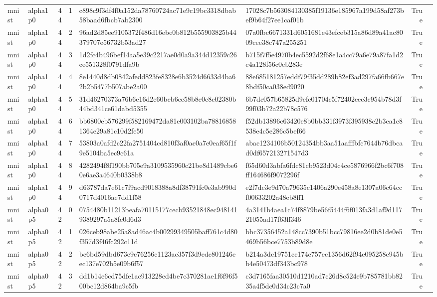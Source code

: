 \begin{tabular}{llrrllrl}
mnist & alpha1p0 & 44 & 1 & c898c9f3df4f0a152da78760724ac71e9c19bc3318dbab58baad6fbcb7ab2300 & 17028c7b563084130385f19136e185967a199d58af273bef9b64f27ee1caf01b & True &  \\
mnist & alpha1p0 & 44 & 2 & 96ad2d85ee9105372f486d16ebe0b812b555903825b44379707e56732b53ad27 & 07a0fbc6671331d6051681e43efceb315a86d89a41ac8009cee38c747a255251 & True &  \\
mnist & alpha1p0 & 44 & 3 & 1d2fc4b496bef14aa5e39c2217ae0d0a9a344d12359c26ce551328f0791dfa9b & b715f7f5e4970b4ec5592d2f68e1a4cc79a6e79a87fa1d2c4a128f56c0eb283e & True &  \\
mnist & alpha1p0 & 44 & 4 & 8e1440d8db0842afedd823fe8328e6b3524d6633d4ba62b2b5477b507abe2a00 & 88e685181257eddf79f35dd289b82ef3ad297fa66fb667e8bdf50ca038ed9020 & True &  \\
mnist & alpha1p0 & 44 & 5 & 31d46270373a76b6e16d2c60beb6ee58b8e0c8c02380b44bd341ce61dabd5355 & 6b7dc057b65825d9efc01704c5f72402eec3c954b78d3f99f03b72a22b78c576 & True &  \\
mnist & alpha1p0 & 44 & 6 & bb6800eb576299f582169472da81e003102ba788168581364e29a81c10d2fe50 & f52db13896c63420e8b0bb331f3973f395938c2b3ea1e8538e4c5e286c5bef66 & True &  \\
mnist & alpha1p0 & 44 & 7 & 53803a0afd2c22fa2751404cd810f3af0ac0a7e0eaf65f1f9e5104ba5ec9c61a & abac1234106b50124354bb3aa51aafffbfc7644b76dbcad0df657213271547d3 & True &  \\
mnist & alpha1p0 & 44 & 8 & 4282494f8f190bb705e9a3109535960c21be8d1489cbe60e6ae3a4640b0338b8 & f65d60d3abfa6fdc81cb9523d04c4ce5876966f2bc6f708ff164686f9072296f & True &  \\
mnist & alpha1p0 & 44 & 9 & d63787da7e61c7f9acd9018388a8df38791fc0e3ab990d0717d4016ae7dd1f58 & e2f7dc3e9d70a79635c1406a290e458a8e1307a06c64ccf00633202a48eb8ff1 & True &  \\
mnist & alpha0p5 & 42 & 0 & 0754480b11213beafa70115177cecb93521848ec9481419389297a5a8fe0d6d3 & 4a3141b4aea1c74f8879be56f5444f6f013fa3d1af9d11721055ad17f63ff346 & True &  \\
mnist & alpha0p5 & 42 & 1 & 026ceb98abe25a8ad46ac4b00299349505baff761c4d80f357d3f46fc292c11d & bbc37356452a148cc7390b51bcc79816ee2d0b81de0e5469b56bce7753b89d8e & True &  \\
mnist & alpha0p5 & 42 & 2 & bc6bd59dbd673e9c76256c1123ac357f3d9edc801246eec137e702b5e09b6f57 & b214a3dc19751cc174c757ec1356d62f94e095258e945bb4e50473df343bc978 & True &  \\
mnist & alpha0p5 & 42 & 3 & dd1b14e6cd75dfe1ac913228ed4be7c370281ae1f6f96f500bc12d864ba9c5fb & c3d7165faa30510d1210ad7c26d8c524e9b785781bb8235a4f5dc0d34c23c7a0 & True &  \\

\end{tabular}
